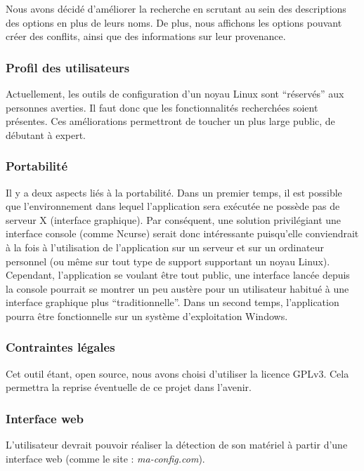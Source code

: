 \documentclass[17pts]{report}
\begin{document}
Nous avons décidé d’améliorer la recherche en scrutant au sein des descriptions
des options en plus de leurs noms. De plus, nous affichons les options pouvant
créer des conflits, ainsi que des informations sur leur provenance.

\subsubsection{Profil des utilisateurs}
\label{sec:Profil des utilisateurs}
Actuellement, les outils de configuration d’un noyau Linux sont “réservés” aux
personnes averties. Il faut donc que les fonctionnalités recherchées soient
présentes. Ces améliorations permettront de toucher un plus large public, de
débutant à expert.

\subsubsection{Portabilité}
\label{sec:Portabilité}
Il y a deux aspects liés à la portabilité. Dans un premier temps, il est
possible que l’environnement dans lequel l’application sera exécutée ne possède
pas de serveur X (interface graphique). Par conséquent, une solution
privilégiant une interface console (comme Ncurse) serait donc intéressante
puisqu’elle conviendrait à la fois à l’utilisation de l’application sur un
serveur et sur un ordinateur personnel (ou même sur tout type de support
supportant un noyau Linux). Cependant, l’application se voulant être tout
public, une interface lancée depuis la console pourrait se montrer un peu
austère pour un utilisateur habitué à une interface graphique plus
“traditionnelle”.  Dans un second temps, l’application pourra être
fonctionnelle sur un système d’exploitation Windows.

\subsubsection{Contraintes légales}
\label{sec:Contraintes légales}
Cet outil étant, open source, nous avons choisi d’utiliser la licence GPLv3.
Cela permettra la reprise éventuelle de ce projet dans l’avenir.

\subsubsection{Interface web}
\label{sec:Interface web}
L’utilisateur devrait pouvoir réaliser la détection de son matériel à partir
d’une interface web (comme le site : \textit{ma-config.com}).
\end{document}
